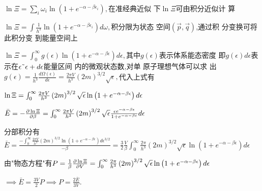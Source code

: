 \documentclass{ctexart}
\begin{document}
$\ln \Xi =\underset{i}{\sum }\omega _{i}\ln \left( 1+e^{-\alpha -\beta
\epsilon _{i}}\right) ,$在准经典近似%
下$\ln \Xi $可由积分近似计%
算

$\ln \Xi =\int \frac{1}{h^{3}}\ln \left( 1+e^{-\alpha -\beta \epsilon
_{i}}\right) d\omega ,$积分限为状态%
空间$\left( \vec{p},\vec{q}\right) $,通过积%
分变换可将此积分变%
到能量空间上

$\ln \Xi =\int_{0}^{\infty }g\left( \epsilon \right) \ln \left( 1+e^{-\alpha
-\beta \epsilon }\right) d\epsilon ,$其中$g\left( \epsilon
\right) $表示体系能态密度%
即$g\left( \epsilon \right) d\epsilon $表示在$%
\epsilon \symbol{126}\epsilon +d\epsilon $能量区间%
内的微观状态数,对单%
原子理想气体可以求%
出$g\left( \epsilon \right) =\frac{1}{h^{3}}\frac{d\Omega \left(
\epsilon \right) }{d\epsilon }=\frac{2\pi V}{h^{3}}\left( 2m\right) ^{3/2}%
\sqrt{\epsilon },$代入上式有

$\ln \Xi =\int_{0}^{\infty }\frac{2\pi V}{h^{3}}\left( 2m\right) ^{3/2}\sqrt{%
\epsilon }\ln \left( 1+e^{-\alpha -\beta \epsilon }\right) d\epsilon $

$\bar{E}=-\frac{\partial \ln \Xi }{\partial \beta }=\int_{0}^{\infty }\frac{%
2\pi V}{h^{3}}\left( 2m\right) ^{3/2}\sqrt{\epsilon }\frac{\epsilon
e^{-\alpha -\beta \epsilon }}{1+e^{-\alpha -\beta \epsilon }}d\epsilon $

分部积分有$\bar{E}=\frac{-\int_{0}^{\infty }%
\frac{2\pi V}{h^{3}}\left( 2m\right) ^{3/2}\ln \left( 1+e^{-\alpha -\beta
\epsilon }\right) d\epsilon ^{3/2}}{-\beta }=\frac{3}{2}\frac{V}{\beta }%
\int_{0}^{\infty }\frac{2\pi }{h^{3}}\left( 2m\right) ^{3/2}\sqrt{\epsilon }%
\ln \left( 1+e^{-\alpha -\beta \epsilon }\right) d\epsilon $

由"物态方程"有$P=\frac{1}{\beta }\frac{%
\partial \ln \Xi }{\partial V}=\int_{0}^{\infty }\frac{2\pi }{h^{3}}\left(
2m\right) ^{3/2}\sqrt{\epsilon }\ln \left( 1+e^{-\alpha -\beta \epsilon
}\right) d\epsilon $

$\implies \bar{E}=\frac{3V}{2}P\implies P=\frac{2\bar{E}}{3V}.$
\end{document}
